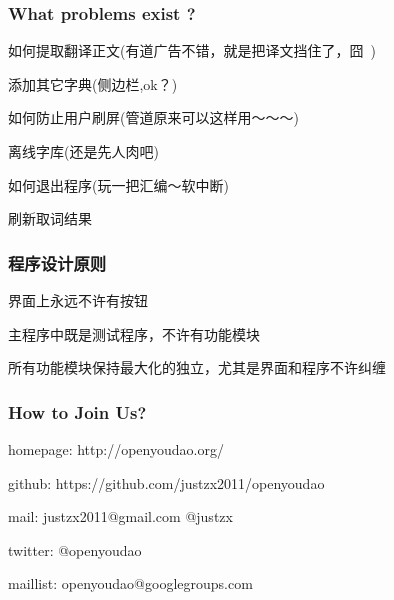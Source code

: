 \documentclass[10pt]{beamer}
\begin{document}
\begin{CJK*}{UTF8}{song}
\begin{frame}
\begin{itemize}
{ }
\end{itemize}
\end{frame}
\begin{frame}
  \frametitle{\Large{What problems exist ?}}
\begin{itemize}
{ 
  \item 如何提取翻译正文(有道广告不错，就是把译文挡住了，囧~) 
  \item 添加其它字典(侧边栏,ok？)
  \item 如何防止用户刷屏(管道原来可以这样用～～～)
  \item 离线字库(还是先人肉吧)
  \item 如何退出程序(玩一把汇编～软中断) 
  \item 刷新取词结果
}
\end{itemize}
\end{frame}

\begin{frame}
   \frametitle{程序设计原则}
\Large\begin{itemize}
 {\item 界面上永远不许有按钮
  \item 主程序中既是测试程序，不许有功能模块
  \item 所有功能模块保持最大化的独立，尤其是界面和程序不许纠缠
 }
\end{itemize}
\end{frame}
\begin{frame}
  \frametitle{How to Join Us?}

\begin{itemize}
\Large{
  \item homepage: http://openyoudao.org/
  \item github:
   https://github.com/justzx2011/openyoudao
  \item mail: justzx2011@gmail.com  @justzx
  \item twitter: @openyoudao
  \item maillist: openyoudao@googlegroups.com
}
  
\end{itemize}

\end{frame}

\end{CJK*}
\end{document}

